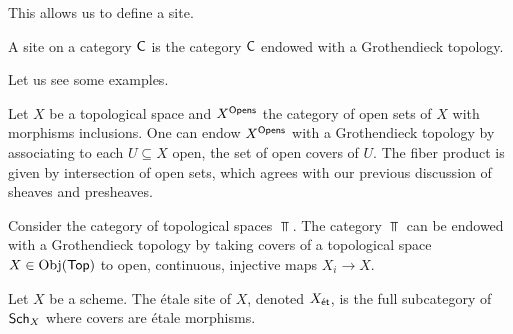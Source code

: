 This allows us to define a site. 
\begin{definition}[Site]\label{def: site}
    A site on a category $\mathsf{C}$ is the category $\mathsf{C}$ endowed with a Grothendieck topology. 
\end{definition}
Let us see some examples.
\begin{example}
    Let $X$ be a topological space and $X^{\mathsf{Opens}}$ the category of open sets of $X$ with morphisms inclusions. One can endow $X^{\mathsf{Opens}}$ with a Grothendieck topology by associating to each $U\subseteq X$ open, the set of open covers of $U$. The fiber product is given by intersection of open sets, which agrees with our previous discussion of sheaves and presheaves. 
\end{example}
\begin{example}
    Consider the category of topological spaces $\Top$. The category $\Top$ can be endowed with a Grothendieck topology by taking covers of a topological space $X\in\mathrm{Obj}(\mathsf{Top})$ to open, continuous, injective maps $X_{i}\to X$. 
\end{example}
\begin{example}
    Let $X$ be a scheme. The \'{e}tale site of $X$, denoted $X_{\mathsf{\acute{e}t}}$, is the full subcategory of $\mathsf{Sch}_{X}$ where covers are \'{e}tale morphisms. 
\end{example}